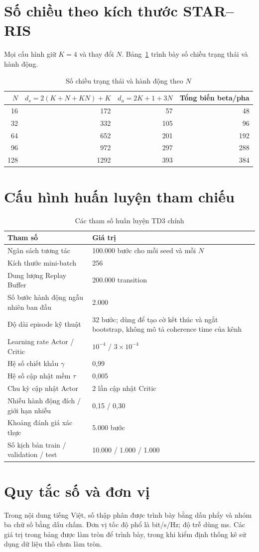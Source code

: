\section{Số chiều theo kích thước STAR--RIS}
Mọi cấu hình giữ $K=4$ và thay đổi $N$. Bảng~\ref{tab:dimension-by-n} trình bày số chiều trạng thái và hành động.

\begin{table}[H]
\caption{Số chiều trạng thái và hành động theo $N$}
\label{tab:dimension-by-n}
\centering
\begin{tabular}{rrrr}
\toprule
$N$ & $d_s=2(K+N+KN)+K$ & $d_a=2K+1+3N$ & Tổng biến beta/pha\\
\midrule
16 & 172 & 57 & 48\\
32 & 332 & 105 & 96\\
64 & 652 & 201 & 192\\
96 & 972 & 297 & 288\\
128 & 1292 & 393 & 384\\
\bottomrule
\end{tabular}
\end{table}

\section{Cấu hình huấn luyện tham chiếu}
\begin{table}[H]
\caption{Các tham số huấn luyện TD3 chính}
\label{tab:appendix-training-config}
\begin{tabularx}{\textwidth}{p{6.0cm}Y}
\toprule
\textbf{Tham số} & \textbf{Giá trị}\\
\midrule
Ngân sách tương tác & 100.000 bước cho mỗi seed và mỗi $N$\\
Kích thước mini-batch & 256\\
Dung lượng Replay Buffer & 200.000 transition\\
Số bước hành động ngẫu nhiên ban đầu & 2.000\\
Độ dài episode kỹ thuật & 32 bước; dùng để tạo cờ kết thúc và ngắt bootstrap, không mô tả coherence time của kênh\\
Learning rate Actor / Critic & $10^{-4}$ / $3\times10^{-4}$\\
Hệ số chiết khấu $\gamma$ & 0,99\\
Hệ số cập nhật mềm $\tau$ & 0,005\\
Chu kỳ cập nhật Actor & 2 lần cập nhật Critic\\
Nhiễu hành động đích / giới hạn nhiễu & 0,15 / 0,30\\
Khoảng đánh giá xác thực & 5.000 bước\\
Số kịch bản train / validation / test & 10.000 / 1.000 / 1.000\\
\bottomrule
\end{tabularx}
\end{table}

\section{Quy tắc số và đơn vị}
Trong nội dung tiếng Việt, số thập phân được trình bày bằng dấu phẩy và nhóm ba chữ số bằng dấu chấm. Đơn vị tốc độ phổ là bit/s/Hz; độ trễ dùng ms. Các giá trị trong bảng được làm tròn để trình bày, trong khi kiểm định thống kê sử dụng dữ liệu thô chưa làm tròn.
